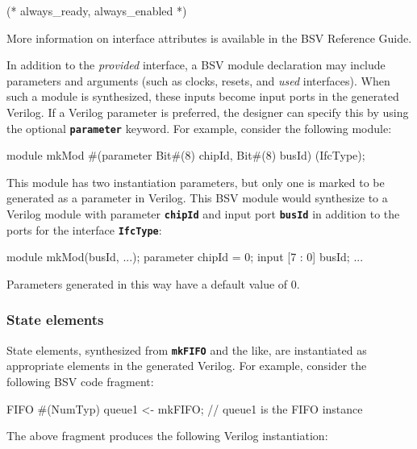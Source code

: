 \documentclass{article}
\newenvironment{centerboxverbatim}
  {\center
   \boxedverbatim}
  {\endboxedverbatim
  {\endcenter }}
\begin{document}
\begin{centerboxverbatim}
(* always_ready, always_enabled *)
\end{centerboxverbatim}

More information on interface attributes is available in the BSV
Reference Guide.

In addition to the {\it provided} interface, a BSV module declaration may
include parameters and arguments (such as clocks, resets, and
{\it used} interfaces).  When such a module is synthesized, these
inputs become input ports in the generated Verilog.  If a Verilog parameter
is preferred, the designer can specify this by using the optional
{\bf\tt parameter} keyword.  For example, consider the following module:

\begin{centerboxverbatim}
module mkMod #(parameter Bit#(8) chipId, Bit#(8) busId) (IfcType);
\end{centerboxverbatim}

This module has two instantiation parameters, but only one is marked
to be generated as a parameter in Verilog.  This BSV module would
synthesize to a Verilog module with parameter {\bf\tt chipId} and
input port {\bf\tt busId} in addition to the ports for the interface
{\bf\tt IfcType}:

\begin{centerboxverbatim}
module mkMod(busId,
             ...);
  parameter chipId = 0;
  input  [7 : 0] busId;
  ...
\end{centerboxverbatim}

Parameters generated in this way have a default value of 0.


\subsubsection{State elements}

State elements, synthesized from {\bf\tt mkFIFO} and the
like, are instantiated as appropriate elements in the generated
Verilog.  For example, consider the following BSV code fragment:

\begin{centerboxverbatim}
FIFO #(NumTyp) queue1 <- mkFIFO;   // queue1 is the FIFO instance
\end{centerboxverbatim}

The above fragment produces the following Verilog instantiation:

\end{document}
